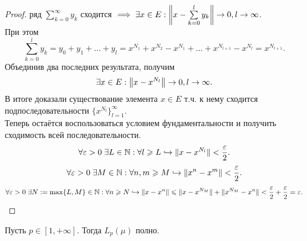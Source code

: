 \begin{proof}
		ряд $\sum\limits_{k=0}^\infty y_k$ сходится $\implies \exists x \in E: \left\|x - \sum\limits_{k=0}^l y_k\right\| \rightarrow 0, l \rightarrow \infty$.\\
		При этом \[
			\sum_{k=0}^l y_k = y_0 + y_1 + \dots + y_l = x^{N_1} + x^{N_2} - x^{N_1} + \dots + x^{N_{l+1}} - x^{N_l} = x^{N_{l+1}}.
		\]
		Объединив два последних результата, получим \[
			\exists x \in E: \left\|x - x^{N_l}\right\| \rightarrow 0, l \rightarrow \infty.
		\]
		В итоге доказали существование элемента $x \in E$ т.ч. к нему сходится подпоследовательности $\{x^{N_l}\}_{l=1}^\infty$.\\
		Теперь остаётся воспользоваться условием фундаментальности и получить сходимость всей последовательности.
		\[
			\forall \varepsilon > 0\; \exists L \in \mathbb{N}: \forall l \geqslant L \hookrightarrow \|x - x^{N_l}\| < \frac{\varepsilon}{2}.
		\]\[
			\forall \varepsilon > 0\; \exists M \in \mathbb{N}: \forall n, m \geqslant M \hookrightarrow \|x^n - x^m\| < \frac{\varepsilon}{2}.
		\]\[
			\forall \varepsilon > 0\; \exists N := \max\{L, M\} \in \mathbb{N}: \forall n \geqslant N	 \hookrightarrow \| x - x^n \| \leqslant \| x - x^{N_M}\| + \| x^{N_M} - x^n\| < \frac{\varepsilon}{2} + \frac{\varepsilon}{2} = \varepsilon.
		\]
\end{proof}
\begin{theorem}
	Пусть $p \in [1, +\infty]$. Тогда $L_p(\mu)$ полно.\\
\end{theorem}
